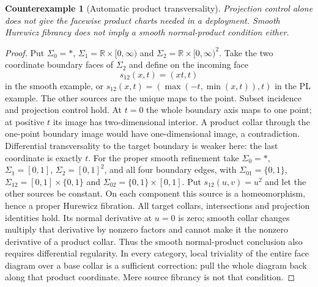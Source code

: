\documentclass[11pt,a4paper]{article}
\newtheorem{counterexample}[theorem]{Counterexample}
\theoremstyle{definition}
\newcommand{\R}{\mathbb R}
\begin{document}
\begin{counterexample}[Automatic product transversality]\label{ex:transverse}
Projection control alone does not give the facewise product charts needed
in a deployment. Smooth Hurewicz fibrancy does not imply a smooth
normal-product condition either.
\end{counterexample}
\begin{proof}
Put $\Sigma_0=*$, $\Sigma_1=\R\times[0,\infty)$ and
$\Sigma_2=\R\times[0,\infty)^2$. Take the two coordinate boundary
faces of $\Sigma_2$ and define on the incoming face
\[
 s_{12}(x,t)=(xt,t)
\]
in the smooth example, or
$s_{12}(x,t)=(\max(-t,\min(x,t)),t)$ in the PL example.
The other sources are the unique maps to the point. Subset incidence
and projection control hold. At $t=0$ the whole boundary axis maps
to one point; at positive $t$ its image has two-dimensional interior.
A product collar through the one-point boundary image would have
one-dimensional image, a contradiction. Differential transversality
to the target boundary is weaker here: the last coordinate is exactly
$t$. For the proper smooth refinement take $\Sigma_0=*$,
$\Sigma_1=[0,1]$, $\Sigma_2=[0,1]^2$, and all four boundary edges,
with $\Sigma_{01}=\{0,1\}$,
$\Sigma_{12}=[0,1]\times\{0,1\}$ and
$\Sigma_{02}=\{0,1\}\times[0,1]$. Put
$s_{12}(u,v)=u^2$ and let the other sources be constant. On each
component this source is a homeomorphism, hence a proper Hurewicz
fibration. All target collars, intersections and projection identities
hold. Its normal derivative at $u=0$ is zero; smooth collar changes
multiply that derivative by nonzero factors and cannot make it the
nonzero derivative of a product collar. Thus the smooth normal-product
conclusion also requires differential regularity. In every category,
local triviality of the entire face diagram over a base collar is a
sufficient correction: pull the whole diagram back along that product
coordinate. Mere source fibrancy is not that condition.
\end{proof}
\end{document}
